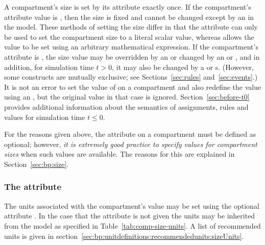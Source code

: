 A compartment's size is set by its 
attribute exactly once.  If the compartment's
 attribute value is , then the size is 
fixed and cannot be changed except by
an \InitialAssignment in the model.  These methods of setting the size
differ in that the  attribute can only be used to set
the compartment size to a literal scalar value, whereas
\InitialAssignment allows the value to be set using an arbitrary
mathematical expression.  If the compartment's 
attribute is , the size value may be overridden by an
\InitialAssignment or changed by an \AssignmentRule or
\AlgebraicRule, and in addition, for simulation time $t > 0$, it
may also be changed by a \RateRule or \Event{}s.  (However, some
constructs are mutually exclusive; see Sections~\ref{sec:rules}
and~\ref{sec:events}.)  It is not an error to set the value of 
on a compartment and also redefine the value using an
\InitialAssignment, but the original  value in that case is
ignored.  Section~\ref{sec:before-t0} provides additional
information about the semantics of assignments, rules and values
for simulation time $t \leq 0$.

For the reasons given above, the  attribute on a
compartment must be defined as optional; however, \emph{it is
  extremely good practice to specify values for compartment sizes}
when such values are available. The reasons for this are explained
in Section~\ref{sec:bp:size}.


\subsubsection{The  attribute}
\label{sec:compartment-units}

The units associated with the compartment's  value may
be set using the optional attribute .  In the case that
the attribute  is not given the units may be
inherited from the model as specified in
Table~\ref{tab:comp-size-units}. A list of recommended units is given in
section~\vref{sec:bp:unitdefinitions:recommendedunits:sizeUnits}.
  
